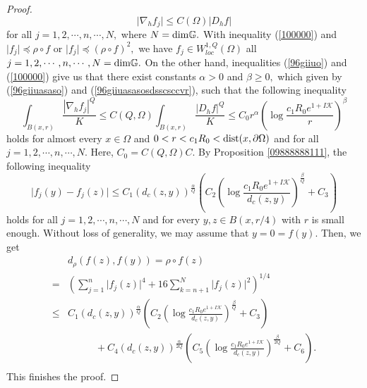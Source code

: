 \documentclass[11pt,twoside]{article}
\theoremstyle{definition}
\theoremstyle{remark}
\newcommand{\abs}[1]{\left|#1\right|}
\begin{document}
\begin{proof}
\begin{equation}
\vert\nabla_{h}f_{j}\vert\leq C(\Omega)\vert D_{h}f\vert
\end{equation} for all $j=1,2,\cdots,n,\cdots,N,$ where $N={\rm dim}\mathbb{G}.$ With inequality (\ref{100000}) and $\vert f_{j}\vert\preceq\rho\circ f$ or $\vert f_{j}\vert\preceq(\rho\circ f)^{2},$ we have
$f_{j}\in W_{loc}^{1,Q}(\Omega)$ all $j=1,2,\cdots,n,\cdots,N={\rm dim}\mathbb{G}.$
On the other hand, inequalities  (\ref{96giiuo})  and (\ref{100000}) give us that there exist constants $\alpha>0$ and $\beta\geq0,$ which given by (\ref{96giiuasaso}) and (\ref{96giiuasasosdsscsccvr}), such that the following inequality 
\begin{equation}
\int_{B(x,r)}\frac{\abs{ \nabla_{h}f_{j}}^{Q}}{K}\leq C(Q,\Omega)\int_{B(x,r)}\frac{\abs{ D_{h}f}^{Q}}{K}\leq C_{0} r^{\alpha}\left(\log\frac{c_{1}R_{0}e^{1+I\mathcal{K}}}{r}\right)^{\beta}
\end{equation}
holds for almost every $x\in\Omega$ and $0<r<c_{1}R_{0}<{\rm dist}(x,\partial\Omega)$ and for all $j=1,2,\cdots,n,\cdots,N.$ Here, $C_{0}=C(Q, \Omega)C.$ By Proposition \ref{09888888111}, the following inequality
\begin{equation}
\vert f_{j}(y)-f_{j}(z)\vert\leq C_{1}(d_{c}(z,y))^{\frac{\alpha}{Q}}\left(C_{2}\left(\log\frac{c_{1}R_{0}e^{1+I\mathcal{K}}}{d_{c}(z,y)}\right)^{\frac{\beta}{Q}}+C_{3}\right)
\end{equation}
holds for all $j=1,2,\cdots,n,\cdots,N$ and for every $y,z\in B(x,r/4)$ with $r$ is small enough. Without loss of generality, we may assume that $y=0=f(y).$ Then,  we get
\begin{equation}\label{556116}
\begin{aligned}
&d_{\rho}(f(z),f(y))=\rho\circ f(z)\\
=&\left( \sum_{j=1}^{n}\vert f_{j}(z)\vert^{4}+16\sum_{k=n+1}^{N}\vert f_{j}(z)\vert^{2}\right)^{1/4}\\
\leq&C_{1}(d_{c}(z,y))^{\frac{\alpha}{Q}}\left(C_{2}\left(\log\frac{c_{1}R_{0}e^{1+I\mathcal{K}}}{d_{c}(z,y)}\right)^{\frac{\beta}{Q}}+C_{3}\right)\\
&\;\;\;\;\;\;\;\;\;\;+C_{4}(d_{c}(z,y))^{\frac{\alpha}{2Q}}\left(C_{5}\left(\log\frac{c_{1}R_{0}e^{1+I\mathcal{K}}}{d_{c}(z,y)}\right)^{\frac{\beta}{2Q}}+C_{6}\right).\\
\end{aligned}
\end{equation}
This finishes the proof.
\end{proof}
\end{document}
